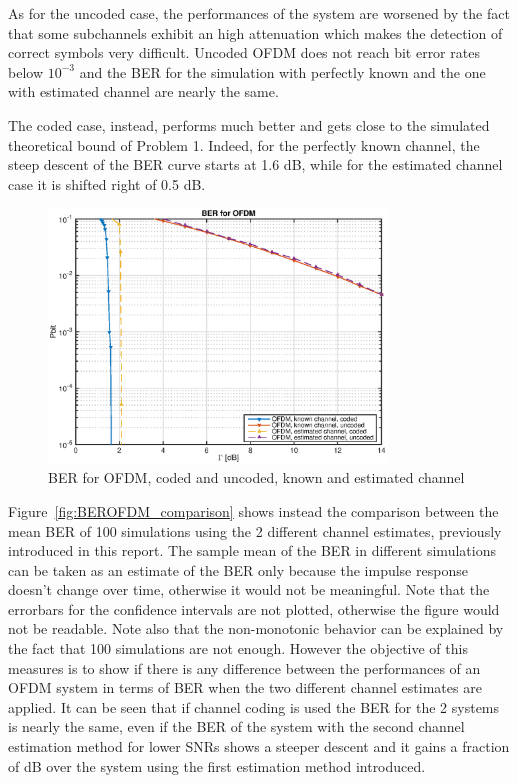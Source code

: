 \documentclass[10pt]{article}
\begin{document}
As for the uncoded case, the performances of the system are worsened by the fact that some subchannels exhibit an high attenuation which makes the detection of correct symbols very difficult. Uncoded OFDM does not reach bit error rates below $10^{-3}$ and the BER for the simulation with perfectly known and the one with estimated channel are nearly the same. 

The coded case, instead, performs much better and gets close to the simulated theoretical bound of Problem 1. Indeed, for the perfectly known channel, the steep descent of the BER curve starts at 1.6 dB, while for the estimated channel case it is shifted right of 0.5 dB.
\begin{figure}[h!]
	\centering
	\includegraphics[width = 0.8\textwidth]{OFDM_BER_1}
	\caption{BER for OFDM, coded and uncoded, known and estimated channel}
	\label{fig:BEROFDM}
\end{figure}

Figure~\ref{fig:BEROFDM_comparison} shows instead the comparison between the mean BER of 100 simulations using the 2 different channel estimates, previously introduced in this report. The sample mean of the BER in different simulations can be taken as an estimate of the BER only because the impulse response doesn't change over time, otherwise it would not be meaningful. Note that the errorbars for the confidence intervals are not plotted, otherwise the figure would not be readable. Note also that the non-monotonic behavior can be explained by the fact that 100 simulations are not enough. However the objective of this measures is to show if there is any difference between the performances of an OFDM system in terms of BER when the two different channel estimates are applied. It can be seen that if channel coding is used the BER for the 2 systems is nearly the same, even if the BER of the system with the second channel estimation method for lower SNRs shows a steeper descent and it gains a fraction of dB over the system using the first estimation method introduced. 
\end{document}
